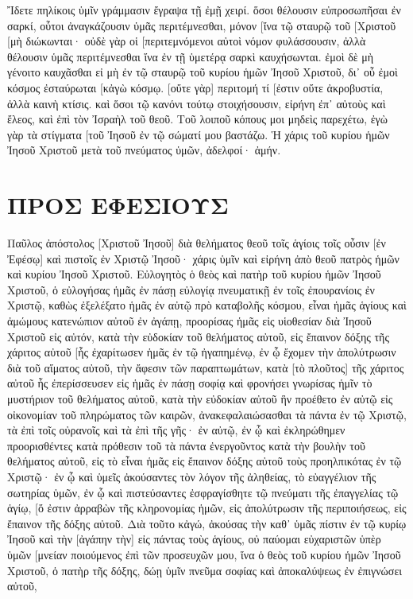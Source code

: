 Ἴδετε πηλίκοις ὑμῖν γράμμασιν ἔγραψα τῇ ἐμῇ χειρί. 
ὅσοι θέλουσιν εὐπροσωπῆσαι ἐν σαρκί, οὗτοι ἀναγκάζουσιν ὑμᾶς περιτέμνεσθαι, μόνον [ἵνα τῷ σταυρῷ τοῦ [Χριστοῦ [μὴ διώκωνται· 
οὐδὲ γὰρ οἱ [περιτεμνόμενοι αὐτοὶ νόμον φυλάσσουσιν, ἀλλὰ θέλουσιν ὑμᾶς περιτέμνεσθαι ἵνα ἐν τῇ ὑμετέρᾳ σαρκὶ καυχήσωνται. 
ἐμοὶ δὲ μὴ γένοιτο καυχᾶσθαι εἰ μὴ ἐν τῷ σταυρῷ τοῦ κυρίου ἡμῶν Ἰησοῦ Χριστοῦ, δι᾽ οὗ ἐμοὶ κόσμος ἐσταύρωται [κἀγὼ κόσμῳ. 
[οὔτε γὰρ] περιτομή τί [ἐστιν οὔτε ἀκροβυστία, ἀλλὰ καινὴ κτίσις. 
καὶ ὅσοι τῷ κανόνι τούτῳ στοιχήσουσιν, εἰρήνη ἐπ᾽ αὐτοὺς καὶ ἔλεος, καὶ ἐπὶ τὸν Ἰσραὴλ τοῦ θεοῦ. 
Τοῦ λοιποῦ κόπους μοι μηδεὶς παρεχέτω, ἐγὼ γὰρ τὰ στίγματα [τοῦ Ἰησοῦ ἐν τῷ σώματί μου βαστάζω. 
Ἡ χάρις τοῦ κυρίου ἡμῶν Ἰησοῦ Χριστοῦ μετὰ τοῦ πνεύματος ὑμῶν, ἀδελφοί· ἀμήν. 
\section{ΠΡΟΣ ΕΦΕΣΙΟΥΣ}
Παῦλος ἀπόστολος [Χριστοῦ Ἰησοῦ] διὰ θελήματος θεοῦ τοῖς ἁγίοις τοῖς οὖσιν [ἐν Ἐφέσῳ] καὶ πιστοῖς ἐν Χριστῷ Ἰησοῦ· 
χάρις ὑμῖν καὶ εἰρήνη ἀπὸ θεοῦ πατρὸς ἡμῶν καὶ κυρίου Ἰησοῦ Χριστοῦ. 
Εὐλογητὸς ὁ θεὸς καὶ πατὴρ τοῦ κυρίου ἡμῶν Ἰησοῦ Χριστοῦ, ὁ εὐλογήσας ἡμᾶς ἐν πάσῃ εὐλογίᾳ πνευματικῇ ἐν τοῖς ἐπουρανίοις ἐν Χριστῷ, 
καθὼς ἐξελέξατο ἡμᾶς ἐν αὐτῷ πρὸ καταβολῆς κόσμου, εἶναι ἡμᾶς ἁγίους καὶ ἀμώμους κατενώπιον αὐτοῦ ἐν ἀγάπῃ, 
προορίσας ἡμᾶς εἰς υἱοθεσίαν διὰ Ἰησοῦ Χριστοῦ εἰς αὐτόν, κατὰ τὴν εὐδοκίαν τοῦ θελήματος αὐτοῦ, 
εἰς ἔπαινον δόξης τῆς χάριτος αὐτοῦ [ἧς ἐχαρίτωσεν ἡμᾶς ἐν τῷ ἠγαπημένῳ, 
ἐν ᾧ ἔχομεν τὴν ἀπολύτρωσιν διὰ τοῦ αἵματος αὐτοῦ, τὴν ἄφεσιν τῶν παραπτωμάτων, κατὰ [τὸ πλοῦτος] τῆς χάριτος αὐτοῦ 
ἧς ἐπερίσσευσεν εἰς ἡμᾶς ἐν πάσῃ σοφίᾳ καὶ φρονήσει 
γνωρίσας ἡμῖν τὸ μυστήριον τοῦ θελήματος αὐτοῦ, κατὰ τὴν εὐδοκίαν αὐτοῦ ἣν προέθετο ἐν αὐτῷ 
εἰς οἰκονομίαν τοῦ πληρώματος τῶν καιρῶν, ἀνακεφαλαιώσασθαι τὰ πάντα ἐν τῷ Χριστῷ, τὰ ἐπὶ τοῖς οὐρανοῖς καὶ τὰ ἐπὶ τῆς γῆς· ἐν αὐτῷ, 
ἐν ᾧ καὶ ἐκληρώθημεν προορισθέντες κατὰ πρόθεσιν τοῦ τὰ πάντα ἐνεργοῦντος κατὰ τὴν βουλὴν τοῦ θελήματος αὐτοῦ, 
εἰς τὸ εἶναι ἡμᾶς εἰς ἔπαινον δόξης αὐτοῦ τοὺς προηλπικότας ἐν τῷ Χριστῷ· 
ἐν ᾧ καὶ ὑμεῖς ἀκούσαντες τὸν λόγον τῆς ἀληθείας, τὸ εὐαγγέλιον τῆς σωτηρίας ὑμῶν, ἐν ᾧ καὶ πιστεύσαντες ἐσφραγίσθητε τῷ πνεύματι τῆς ἐπαγγελίας τῷ ἁγίῳ, 
[ὅ ἐστιν ἀρραβὼν τῆς κληρονομίας ἡμῶν, εἰς ἀπολύτρωσιν τῆς περιποιήσεως, εἰς ἔπαινον τῆς δόξης αὐτοῦ. 
Διὰ τοῦτο κἀγώ, ἀκούσας τὴν καθ᾽ ὑμᾶς πίστιν ἐν τῷ κυρίῳ Ἰησοῦ καὶ τὴν [ἀγάπην τὴν] εἰς πάντας τοὺς ἁγίους, 
οὐ παύομαι εὐχαριστῶν ὑπὲρ ὑμῶν [μνείαν ποιούμενος ἐπὶ τῶν προσευχῶν μου, 
ἵνα ὁ θεὸς τοῦ κυρίου ἡμῶν Ἰησοῦ Χριστοῦ, ὁ πατὴρ τῆς δόξης, δώῃ ὑμῖν πνεῦμα σοφίας καὶ ἀποκαλύψεως ἐν ἐπιγνώσει αὐτοῦ, 
